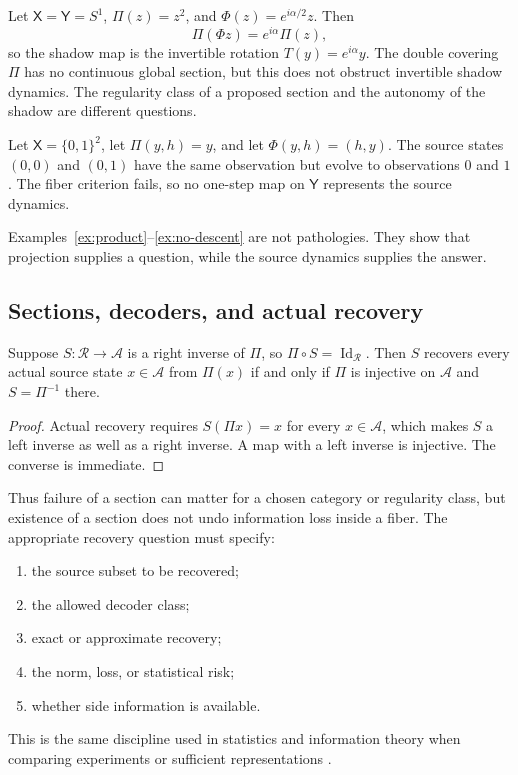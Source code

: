 \documentclass[11pt]{article}
\newcommand{\X}{\mathsf X}
\newcommand{\Y}{\mathsf Y}
\newcommand{\A}{\mathcal A}
\newcommand{\Rset}{\mathcal R}
\begin{document}
\begin{example}\label{ex:cover}
Let $\X=\Y=S^1$, $\Pi(z)=z^2$, and
$\Phi(z)=e^{i\alpha/2}z$.  Then
\[
  \Pi(\Phi z)=e^{i\alpha}\Pi(z),
\]
so the shadow map is the invertible rotation
$T(y)=e^{i\alpha}y$.  The double covering $\Pi$ has no continuous global
section, but this does not obstruct invertible shadow dynamics.  The
regularity class of a proposed section and the autonomy of the shadow are
different questions.
\end{example}

\begin{example}\label{ex:no-descent}
Let $\X=\{0,1\}^2$, let $\Pi(y,h)=y$, and let
$\Phi(y,h)=(h,y)$.  The source states $(0,0)$ and $(0,1)$ have the same
observation but evolve to observations $0$ and $1$.  The fiber criterion
fails, so no one-step map on $\Y$ represents the source dynamics.
\end{example}

Examples~\ref{ex:product}--\ref{ex:no-descent} are not pathologies.  They
show that projection supplies a question, while the source dynamics supplies
the answer.

\subsection{Sections, decoders, and actual recovery}

\begin{proposition}
Suppose $S:\Rset\to\A$ is a right inverse of $\Pi$, so
$\Pi\circ S=\operatorname{Id}_{\Rset}$.  Then $S$ recovers every actual source state
$x\in\A$ from $\Pi(x)$ if and only if $\Pi$ is injective on $\A$ and
$S=\Pi^{-1}$ there.
\end{proposition}

\begin{proof}
Actual recovery requires $S(\Pi x)=x$ for every $x\in\A$, which makes $S$
a left inverse as well as a right inverse.  A map with a left inverse is
injective.  The converse is immediate.
\end{proof}

Thus failure of a section can matter for a chosen category or regularity
class, but existence of a section does not undo information loss inside a
fiber.  The appropriate recovery question must specify:
\begin{enumerate}
\item the source subset to be recovered;
\item the allowed decoder class;
\item exact or approximate recovery;
\item the norm, loss, or statistical risk;
\item whether side information is available.
\end{enumerate}
This is the same discipline used in statistics and information theory when
comparing experiments or sufficient representations
\cite{blackwell1953,cover_thomas}.
\end{document}
